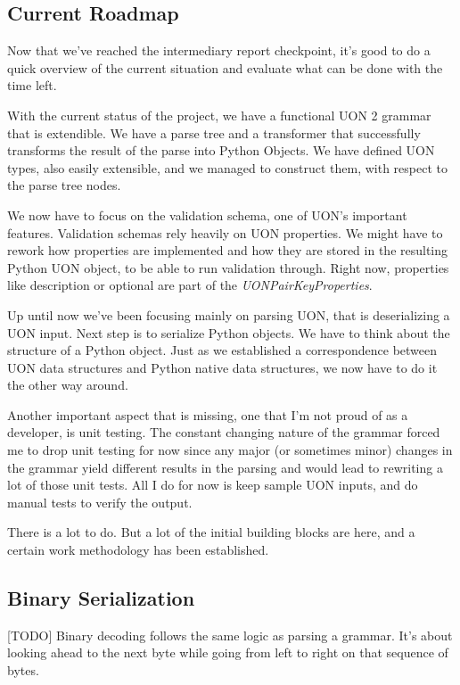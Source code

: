 \documentclass[12pt]{article}
\begin{document}


\subsection{Current Roadmap}
Now that we've reached the intermediary report checkpoint, it's good to do a quick overview of the current situation and evaluate what can be done with the time left.

With the current status of the project, we have a functional UON 2 grammar that is extendible. We have a parse tree and a transformer that successfully transforms the result of the parse into Python Objects. We have defined UON types, also easily extensible, and we managed to construct them, with respect to the parse tree nodes. 

We now have to focus on the validation schema, one of UON's important features. Validation schemas rely heavily on UON properties. We might have to rework how properties are implemented and how they are stored in the resulting Python UON object, to be able to run validation through. Right now, properties like description or optional are part of the \emph{UONPairKeyProperties}. 

Up until now we've been focusing mainly on parsing UON, that is deserializing a UON input. Next step is to serialize Python objects. We have to think about the structure of a Python object. Just as we established a correspondence between UON data structures and Python native data structures, we now have to do it the other way around.

Another important aspect that is missing, one that I'm not proud of as a developer, is unit testing. The constant changing nature of the grammar forced me to drop unit testing for now since any major (or sometimes minor) changes in the grammar yield different results in the parsing and would lead to rewriting a lot of those unit tests. All I do for now is keep sample UON inputs, and do manual tests to verify the output.

There is a lot to do. But a lot of the initial building blocks are here, and a certain work methodology has been established.

\pagebreak

\subsection{Binary Serialization}
[TODO]
Binary decoding follows the same logic as parsing a grammar. It's about looking ahead to the next byte while going from left to right on that sequence of bytes.
\pagebreak
\end{document}
